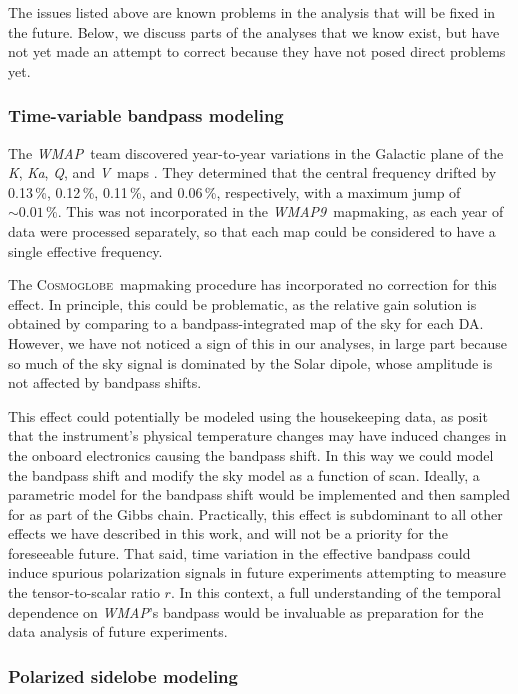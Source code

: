 \documentclass[twocolumn]{../../common/aa}
\def\WMAP{\emph{WMAP}}
\def\WMAPnine{\emph{WMAP9}}
\newcommand{\cosmoglobe}{\textsc{Cosmoglobe}}
\newcommand{\K}[0]{\textit K}
\newcommand{\Ka}[0]{\textit{Ka}}
\newcommand{\Q}[0]{\textit Q}
\newcommand{\V}[0]{\textit V}
\begin{document}
The issues listed above are known problems in the analysis that will be fixed in the future. Below, we discuss parts of the analyses that we know exist, but have not yet made an attempt to correct because they have not posed direct problems yet.

\subsubsection{Time-variable bandpass modeling}

The \WMAP\ team discovered year-to-year variations in the Galactic plane of the \K, \Ka, \Q, and \V\ maps \citep[Appendix A]{bennett2012}. They determined that the central frequency drifted by 0.13\,\%, 0.12\,\%, 0.11\,\%, and 0.06\,\%, respectively, with a maximum jump of $\sim0.01\,\%$. This was not incorporated in the \WMAPnine\ mapmaking, as each year of data were processed separately, so that each map could be considered to have a single effective frequency.

The \cosmoglobe\ mapmaking procedure has incorporated no correction for this effect. In principle, this could be problematic, as the relative gain solution is obtained by comparing to a bandpass-integrated map of the sky for each DA. However, we have not noticed a sign of this in our analyses, in large part because so much of the sky signal is dominated by the Solar dipole, whose amplitude is not affected by bandpass shifts.

This effect could potentially be modeled using the housekeeping data, as \citet{bennett2012} posit that the instrument's physical temperature changes may have induced changes in the onboard electronics causing the bandpass shift. In this way we could model the bandpass shift and modify the sky model as a function of scan. Ideally, a parametric model for the bandpass shift would be implemented and then sampled for as part of the Gibbs chain. Practically, this effect is subdominant to all other effects we have described in this work, and will not be a priority for the foreseeable future. That said, time variation in the effective bandpass could induce spurious polarization signals in future experiments attempting to measure the tensor-to-scalar ratio $r$. In this context, a full understanding of the temporal dependence on \WMAP's bandpass would be invaluable as preparation for the data analysis of future experiments.

\subsubsection{Polarized sidelobe modeling}
\end{document}
